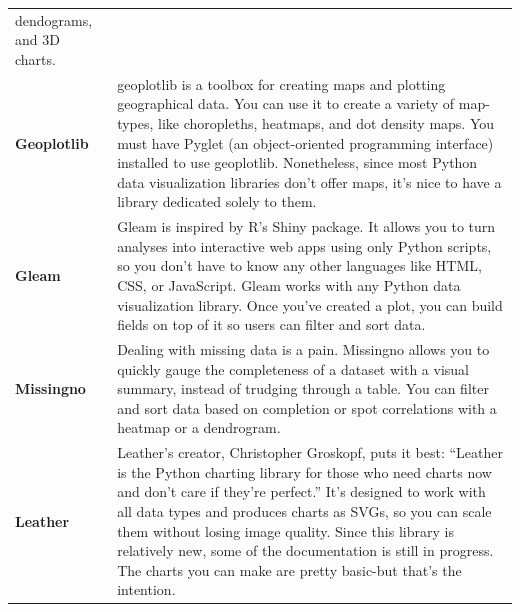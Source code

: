 \documentclass[]{book}
\theoremstyle{definition}
\theoremstyle{definition}
\theoremstyle{definition}
\theoremstyle{remark}
\begin{document}
\begin{longtable}[]{@{}ll@{}}
\begin{minipage}[t]{0.16\columnwidth}
dendograms, and 3D charts.\strut
\end{minipage}\tabularnewline
\begin{minipage}[t]{0.10\columnwidth}\raggedright\strut
\textbf{Geoplotlib}\strut
\end{minipage} & \begin{minipage}[t]{0.16\columnwidth}\raggedright\strut
geoplotlib is a toolbox for creating maps and plotting geographical
data. You can use it to create a variety of map-types, like choropleths,
heatmaps, and dot density maps. You must have Pyglet (an object-oriented
programming interface) installed to use geoplotlib. Nonetheless, since
most Python data visualization libraries don't offer maps, it's nice to
have a library dedicated solely to them.\strut
\end{minipage}\tabularnewline
\begin{minipage}[t]{0.10\columnwidth}\raggedright\strut
\textbf{Gleam}\strut
\end{minipage} & \begin{minipage}[t]{0.16\columnwidth}\raggedright\strut
Gleam is inspired by R's Shiny package. It allows you to turn analyses
into interactive web apps using only Python scripts, so you don't have
to know any other languages like HTML, CSS, or JavaScript. Gleam works
with any Python data visualization library. Once you've created a plot,
you can build fields on top of it so users can filter and sort
data.\strut
\end{minipage}\tabularnewline
\begin{minipage}[t]{0.10\columnwidth}\raggedright\strut
\textbf{Missingno}\strut
\end{minipage} & \begin{minipage}[t]{0.16\columnwidth}\raggedright\strut
Dealing with missing data is a pain. Missingno allows you to quickly
gauge the completeness of a dataset with a visual summary, instead of
trudging through a table. You can filter and sort data based on
completion or spot correlations with a heatmap or a dendrogram.\strut
\end{minipage}\tabularnewline
\begin{minipage}[t]{0.10\columnwidth}\raggedright\strut
\textbf{Leather}\strut
\end{minipage} & \begin{minipage}[t]{0.16\columnwidth}\raggedright\strut
Leather's creator, Christopher Groskopf, puts it best: ``Leather is the
Python charting library for those who need charts now and don't care if
they're perfect.'' It's designed to work with all data types and
produces charts as SVGs, so you can scale them without losing image
quality. Since this library is relatively new, some of the documentation
is still in progress. The charts you can make are pretty basic-but
that's the intention.\strut
\end{minipage}\tabularnewline
\bottomrule
\end{longtable}
\end{document}

